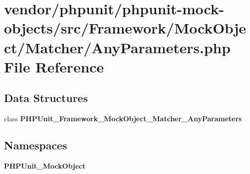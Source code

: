 \section{vendor/phpunit/phpunit-\/mock-\/objects/src/\+Framework/\+Mock\+Object/\+Matcher/\+Any\+Parameters.php File Reference}
\label{_any_parameters_8php}
\subsection*{Data Structures}
\begin{DoxyCompactItemize}
\item 
class {\bf P\+H\+P\+Unit\+\_\+\+Framework\+\_\+\+Mock\+Object\+\_\+\+Matcher\+\_\+\+Any\+Parameters}
\end{DoxyCompactItemize}
\subsection*{Namespaces}
\begin{DoxyCompactItemize}
\item 
 {\bf P\+H\+P\+Unit\+\_\+\+Mock\+Object}
\end{DoxyCompactItemize}
